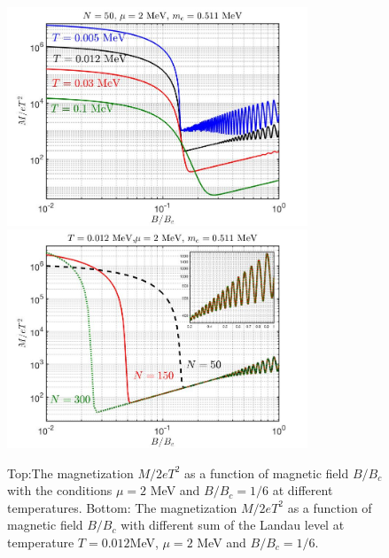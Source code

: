 \documentclass[sn-mathphys,Numbered]{sn-jnl}
\begin{document}
\begin{figure}[ht]
\centering
\includegraphics[width=0.8\textwidth]{./plot/NewFermi_Magnetization_BRange}
\includegraphics[width=0.8\textwidth]{./plot/Magnetization_B_NChecking}
\caption{Top:The magnetization $M/2eT^2$ as a function of magnetic field $B/B_c$ with the conditions $\mu=2$ MeV and $B/B_c=1/6$ at different temperatures. Bottom: The magnetization $M/2eT^2$ as a function of magnetic field $B/B_c$ with different sum of the Landau level at temperature $T=0.012$MeV, $\mu=2$ MeV and $B/B_c=1/6$. }
\label{M_MagneticField}
\end{figure}
\end{document}
